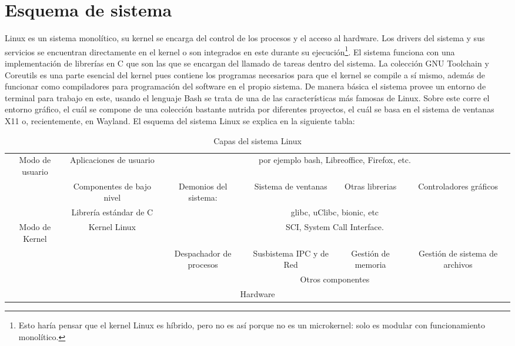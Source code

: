 \documentclass[11pt,letterpaper]{article} 	%
\begin{document}
\section*{Esquema de sistema}
Linux es un sistema monolítico, su kernel se encarga del control de los procesos y el acceso al hardware. Los drivers del sistema y sus servicios se encuentran directamente en el kernel o son integrados en este durante su ejecución\footnote{Esto haría pensar que el kernel Linux es híbrido, pero no es así porque no es un microkernel: solo es modular con funcionamiento monolítico.}. El sistema funciona con una implementación de librerías en C que son las que se encargan del llamado de tareas dentro del sistema. La colección GNU Toolchain y Coreutils es una parte esencial del kernel pues contiene los programas necesarios para que el kernel se compile a sí mismo, además de funcionar como compiladores para programación del software en el propio sistema. De manera básica el sistema provee un entorno de terminal para trabajo en este, usando el lenguaje Bash se trata de una de las características más famosas de Linux. Sobre este corre el entorno gráfico, el cuál se compone de una colección bastante nutrida por diferentes proyectos, el cuál se basa en el sistema de ventanas X11 o, recientemente, en Wayland.
El esquema del sistema Linux se explica en la siguiente tabla:
\begin{table}[H]
\caption{Capas del sistema Linux}
\begin{center}
\begin{adjustbox}{width=1\textwidth}
\begin{tabular}{|c|c|c|c|c|c|}
\hline
\multicolumn{ 1}{|c|}{Modo de usuario} & Aplicaciones  de usuario & \multicolumn{ 4}{c|}{por ejemplo bash, Libreoffice, Firefox, etc.} \\ \cline{ 2- 6}
\multicolumn{ 1}{|c|}{} & Componentes de bajo nivel & Demonios del sistema: & Sistema de ventanas & Otras librerias & Controladores gráficos \\ \cline{ 2- 6}
\multicolumn{ 1}{|c|}{} & Librería estándar de C & \multicolumn{ 4}{c|}{glibc, uClibc, bionic, etc} \\ \hline
\multicolumn{ 1}{|c|}{Modo de Kernel} & \multicolumn{ 1}{c|}{Kernel Linux} & \multicolumn{ 4}{c|}{SCI, System Call Interface.} \\ \cline{ 3- 6}
\multicolumn{ 1}{|c|}{} & \multicolumn{ 1}{c|}{} & Despachador de procesos & Susbistema IPC y de Red & Gestión de memoria & Gestión de sistema de archivos \\ \cline{ 3- 6}
\multicolumn{ 1}{|c|}{} & \multicolumn{ 1}{c|}{} & \multicolumn{ 4}{c|}{Otros componentes} \\ \hline
\multicolumn{ 6}{|c|}{Hardware} \\ \hline
\end{tabular}
\end{adjustbox}
\end{center}
\end{table}
\end{document}
